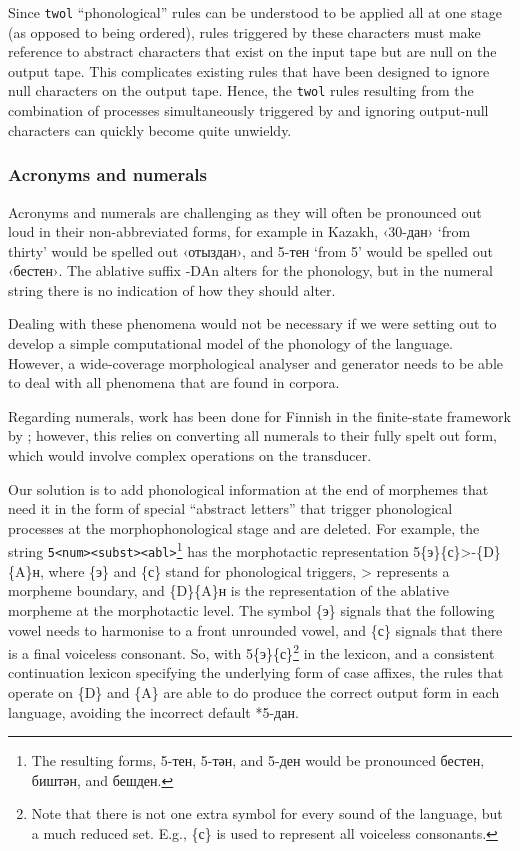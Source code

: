 \documentclass[a4paper,11pt,twocolumn]{article}
\begin{document}
Since \texttt{twol} ``phonological'' rules can be understood to be applied all at one stage (as opposed to being ordered), rules triggered by these characters must make reference to abstract characters that exist on the input tape but are null on the output tape.  This complicates existing rules that have been designed to ignore null characters on the output tape.  Hence, the \texttt{twol} rules resulting from the combination of processes simultaneously triggered by and ignoring output-null characters can quickly become quite unwieldy.


\subsubsection{Acronyms and numerals}
Acronyms and numerals are challenging as they will often be pronounced out loud
   in their non-abbreviated forms, for example in Kazakh, ‹30-дан› `from thirty' would be spelled out ‹отыздан›, and 5-тен `from 5' would be spelled out ‹бестен›. The ablative
   suffix -DAn alters for the phonology, but in the numeral string there is no indication of how they should alter.

Dealing with these phenomena would not be necessary if we were setting out to develop a simple computational
model of the phonology of the language. However, a wide-coverage morphological analyser and generator needs to be 
able to deal with all phenomena that are found in corpora.

Regarding numerals, work has been done for Finnish in the finite-state framework by \citep{karttunen06}; however, this relies on converting all numerals to their fully spelt out form, which would involve complex operations 
on the transducer. 

Our solution is to add phonological information at the end of morphemes that need it in the form of special ``abstract letters'' that trigger phonological processes at the morphophonological stage and are deleted. For example, the string \texttt{5<num><subst><abl>}\footnote{The resulting forms, 5-тен, 5-тән, and 5-ден would be pronounced бестен, биштән, and бешден.} has
the morphotactic representation 5\{э\}\{с\}>-\{D\}\{A\}н, where \{э\} and \{с\} stand for phonological triggers, > represents a morpheme boundary, and \{D\}\{A\}н is the representation of the ablative morpheme at the morphotactic level.  The symbol \{э\} signals that the following vowel needs to harmonise to a front unrounded vowel, and \{с\} signals that there is a final voiceless consonant.  So, with 5\{э\}\{с\}\footnote{Note that there is not one extra symbol for every sound of the language, but a much reduced set.  E.g., \{с\} is used to represent all voiceless consonants.} in the lexicon, and a consistent continuation lexicon specifying the underlying form of case affixes, the rules that operate on \{D\} and \{A\} are able to do produce the correct output form in each language, avoiding the incorrect default *5-дан.
\end{document}
